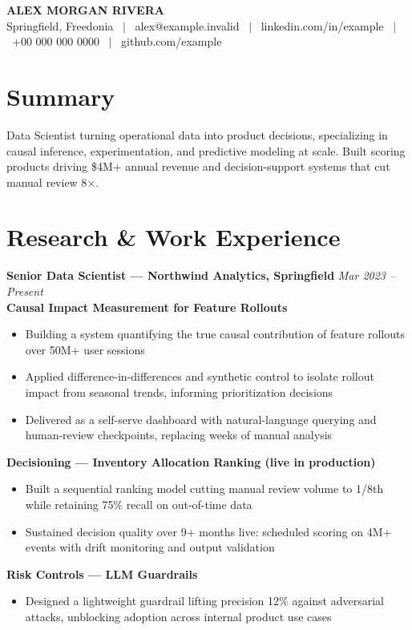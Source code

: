 \documentclass[10pt]{article}
\newcommand{\entry}[2]{\textbf{#1} \hfill \textit{#2}\\[-0.35em]}
\newcommand{\proj}[1]{\vspace{0.5pt}\textbf{#1}\\[-0.4em]}
\begin{document}
\begin{center}
{\LARGE\bfseries ALEX MORGAN RIVERA}\\[2pt]
Springfield, Freedonia \ $|$ \ alex@example.invalid \ $|$ \ linkedin.com/in/example \ $|$ \ +00 000 000 0000 \ $|$ \ github.com/example
\end{center}
\vspace{-6pt}

\section{Summary}
Data Scientist turning operational data into product decisions, specializing in causal inference, experimentation, and predictive modeling at scale. Built scoring products driving \$4M+ annual revenue and decision-support systems that cut manual review 8$\times$.

\section{Research \& Work Experience}
\entry{Senior Data Scientist — Northwind Analytics, Springfield}{Mar 2023 -- Present}

\proj{Causal Impact Measurement for Feature Rollouts}
\begin{itemize}
\item Building a system quantifying the true causal contribution of feature rollouts over 50M+ user sessions
\item Applied difference-in-differences and synthetic control to isolate rollout impact from seasonal trends, informing prioritization decisions
\item Delivered as a self-serve dashboard with natural-language querying and human-review checkpoints, replacing weeks of manual analysis
\end{itemize}

\proj{Decisioning — Inventory Allocation Ranking (live in production)}
\begin{itemize}
\item Built a sequential ranking model cutting manual review volume to 1/8th while retaining 75\% recall on out-of-time data
\item Sustained decision quality over 9+ months live: scheduled scoring on 4M+ events with drift monitoring and output validation
\end{itemize}

\proj{Risk Controls — LLM Guardrails}
\begin{itemize}
\item Designed a lightweight guardrail lifting precision 12\% against adversarial attacks, unblocking adoption across internal product use cases
\end{itemize}
\end{document}
